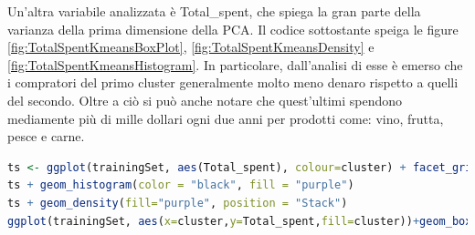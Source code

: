 \documentclass[letterpaper,11pt]{article}
\begin{document}
Un'altra variabile analizzata è Total\_spent, che spiega la gran parte della varianza della prima dimensione della PCA. Il codice sottostante speiga le figure \ref{fig:TotalSpentKmeansBoxPlot}, \ref{fig:TotalSpentKmeansDensity} e \ref{fig:TotalSpentKmeansHistogram}. In particolare, dall'analisi di esse è emerso che i compratori del primo cluster generalmente molto meno denaro rispetto a quelli del secondo. Oltre a ciò si può anche notare che quest'ultimi spendono mediamente più di mille dollari ogni due anni per prodotti come: vino, frutta, pesce e carne.
\begin{lstlisting}[language=R]
ts <- ggplot(trainingSet, aes(Total_spent), colour=cluster) + facet_grid(cluster~.)
ts + geom_histogram(color = "black", fill = "purple") 
ts + geom_density(fill="purple", position = "Stack")
ggplot(trainingSet, aes(x=cluster,y=Total_spent,fill=cluster))+geom_boxplot(outlier.colour="black")
\end{lstlisting}
\end{document}
